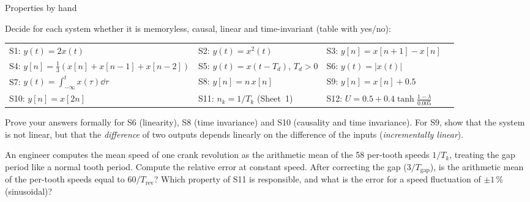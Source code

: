 \begin{exercise}{Properties by hand}{\Paper}
\begin{tasks}
  \item Decide for each system whether it is memoryless, causal, linear and
    time-invariant (table with yes/no):
    \begin{center}
    \small
    \begin{tabular}{@{}llll@{}}
    S1: $y(t)=2x(t)$ & S2: $y(t)=x^2(t)$ & S3: $y[n]=x[n+1]-x[n]$ \\
    S4: $y[n]=\frac13(x[n]+x[n-1]+x[n-2])$ & S5: $y(t)=x(t-T_d)$, $T_d>0$ & S6: $y(t)=|x(t)|$ \\
    S7: $y(t)=\int_{-\infty}^{t}x(\tau)\dd\tau$ & S8: $y[n]=n\,x[n]$ & S9: $y[n]=x[n]+0.5$\\
    S10: $y[n]=x[2n]$ & S11: $n_k=1/T_k$ (Sheet~1) & S12: $U=0.5+0.4\tanh\frac{1-\lambda}{0.005}$
    \end{tabular}
    \end{center}
  \item Prove your answers formally for S6 (linearity), S8 (time invariance)
    and S10 (causality and time invariance). For S9, show that the system is
    not linear, but that the \emph{difference} of two outputs depends linearly
    on the difference of the inputs (\emph{incrementally linear}).
  \item An engineer computes the mean speed of one crank revolution as the
    arithmetic mean of the 58 per-tooth speeds $1/T_k$, treating the gap
    period like a normal tooth period. Compute the relative error at constant
    speed. After correcting the gap ($3/T_{\text{gap}}$), is the arithmetic
    mean of the per-tooth speeds equal to $60/T_{\text{rev}}$? Which property of
    S11 is responsible, and what is the error for a speed fluctuation of
    $\pm1\,\%$ (sinusoidal)?
\end{tasks}
\end{exercise}

